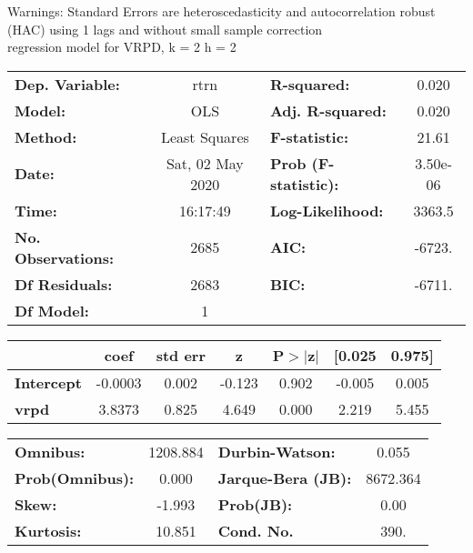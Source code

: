 Warnings: \newline
 [1] Standard Errors are heteroscedasticity and autocorrelation robust (HAC) using 1 lags and without small sample correction\\ 

regression model for VRPD, k = 2 h = 2\begin{center}
\begin{tabular}{lclc}
\toprule
\textbf{Dep. Variable:}    &       rtrn       & \textbf{  R-squared:         } &     0.020   \\
\textbf{Model:}            &       OLS        & \textbf{  Adj. R-squared:    } &     0.020   \\
\textbf{Method:}           &  Least Squares   & \textbf{  F-statistic:       } &     21.61   \\
\textbf{Date:}             & Sat, 02 May 2020 & \textbf{  Prob (F-statistic):} &  3.50e-06   \\
\textbf{Time:}             &     16:17:49     & \textbf{  Log-Likelihood:    } &    3363.5   \\
\textbf{No. Observations:} &        2685      & \textbf{  AIC:               } &    -6723.   \\
\textbf{Df Residuals:}     &        2683      & \textbf{  BIC:               } &    -6711.   \\
\textbf{Df Model:}         &           1      & \textbf{                     } &             \\
\bottomrule
\end{tabular}
\begin{tabular}{lcccccc}
                   & \textbf{coef} & \textbf{std err} & \textbf{z} & \textbf{P$> |$z$|$} & \textbf{[0.025} & \textbf{0.975]}  \\
\midrule
\textbf{Intercept} &      -0.0003  &        0.002     &    -0.123  &         0.902        &       -0.005    &        0.005     \\
\textbf{vrpd}      &       3.8373  &        0.825     &     4.649  &         0.000        &        2.219    &        5.455     \\
\bottomrule
\end{tabular}
\begin{tabular}{lclc}
\textbf{Omnibus:}       & 1208.884 & \textbf{  Durbin-Watson:     } &    0.055  \\
\textbf{Prob(Omnibus):} &   0.000  & \textbf{  Jarque-Bera (JB):  } & 8672.364  \\
\textbf{Skew:}          &  -1.993  & \textbf{  Prob(JB):          } &     0.00  \\
\textbf{Kurtosis:}      &  10.851  & \textbf{  Cond. No.          } &     390.  \\
\bottomrule
\end{tabular}
\end{center}

